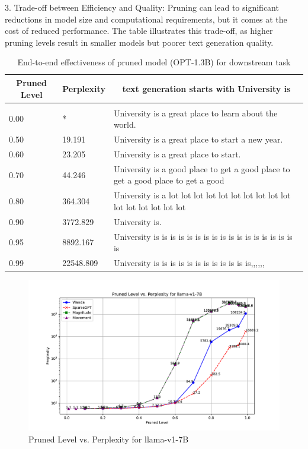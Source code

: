 \documentclass{article} %
\begin{document}
3. Trade-off between Efficiency and Quality: Pruning can lead to significant reductions in model size and computational requirements, but it comes at the cost of reduced performance. The table illustrates this trade-off, as higher pruning levels result in smaller models but poorer text generation quality.

\begin{table}[t]
\caption{End-to-end effectiveness of pruned model (OPT-1.3B) for downstream task}
\label{table-e2e-evaluation}
\begin{center}
\begin{tabular}{lll}
\multicolumn{1}{c}{\bf Pruned Level}  &\multicolumn{1}{c}{\bf Perplexity} & \multicolumn{1}{c}{\bf text generation starts with University is} \\
\hline \\
0.00         & * & University is a great place to learn about the world. \\
0.50         & 19.191 & University is a great place to start a new year. \\
0.60         & 23.205 & University is a great place to start. \\
0.70         & 44.246 & University is a good place to get a good place to get a good place to get a good \\
0.80         & 364.304 & University is a lot lot lot lot lot lot lot lot lot lot lot lot lot lot lot lot \\
0.90         & 3772.829 & University is. \\
0.95         & 8892.167 & University is is is is is is is is is is is is is is is is is is \\
0.99         & 22548.809 & University is is is is is is is is is is is is,,,,,, \\
\end{tabular}
\end{center}
\end{table}

\begin{figure}[h]
\begin{center}
\includegraphics[width=0.8\linewidth]{fig1.pdf}
\end{center}
\caption{Pruned Level vs. Perplexity for llama-v1-7B}
\label{fig:human}
\end{figure}
\end{document}

